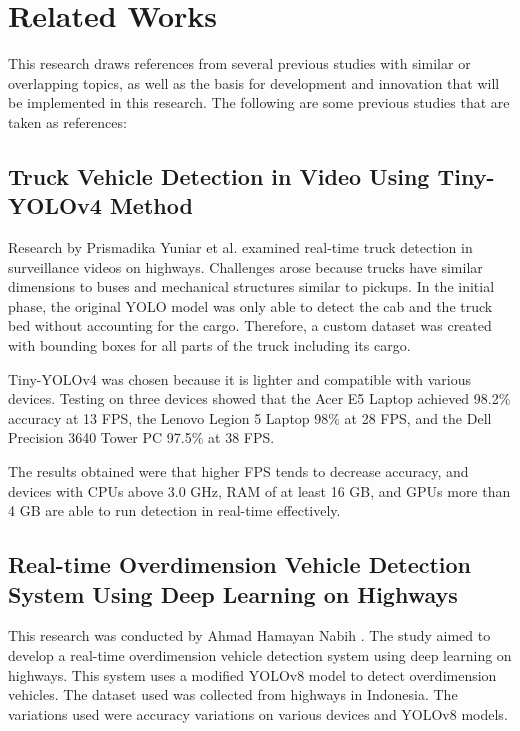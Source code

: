 \section{Related Works}
\label{sec:relatedworks}

This research draws references from several previous studies with similar or overlapping topics, as well as the basis for development and innovation that will be implemented in this research. The following are some previous studies that are taken as references:

\subsection{\textbf{Truck Vehicle Detection in Video Using Tiny-YOLOv4 Method}}
\label{subsec:deteksikendaraantrukprismadika}
Research by Prismadika Yuniar et al. \cite{prismadika2023} examined real-time truck detection in surveillance videos on highways. Challenges arose because trucks have similar dimensions to buses and mechanical structures similar to pickups. In the initial phase, the original YOLO model was only able to detect the cab and the truck bed without accounting for the cargo. Therefore, a custom dataset was created with bounding boxes for all parts of the truck including its cargo.

Tiny-YOLOv4 was chosen because it is lighter and compatible with various devices. Testing on three devices showed that the Acer E5 Laptop achieved 98.2\% accuracy at 13 FPS, the Lenovo Legion 5 Laptop 98\% at 28 FPS, and the Dell Precision 3640 Tower PC 97.5\% at 38 FPS.

The results obtained were that higher FPS tends to decrease accuracy, and devices with CPUs above 3.0 GHz, RAM of at least 16 GB, and GPUs more than 4 GB are able to run detection in real-time effectively.

\subsection{\textbf{Real-time Overdimension Vehicle Detection System Using Deep Learning on Highways}}
\label{subsec:deteksikendaraanoverdimensionhamayan}
This research was conducted by Ahmad Hamayan Nabih \cite{hamayan2024}. The study aimed to develop a real-time overdimension vehicle detection system using deep learning on highways. This system uses a modified YOLOv8 model to detect overdimension vehicles. The dataset used was collected from highways in Indonesia. The variations used were accuracy variations on various devices and YOLOv8 models.

